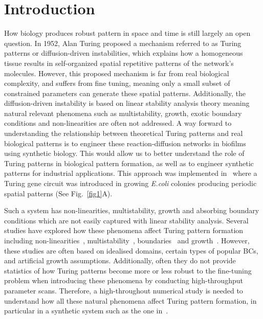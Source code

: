 \section*{Introduction}

How biology produces robust pattern in space and time is still largely an open question.
In 1952, Alan Turing proposed a mechanism referred to as Turing patterns or diffusion-driven instabilities, which explains how a homogeneous tissue results in self-organized spatial repetitive patterns of the network’s molecules.
However, this proposed mechanism is far from real biological complexity, and suffers from fine tuning, meaning only a small subset of constrained parameters can generate these spatial patterns.
Additionally, the diffusion-driven instability is based on linear stability analysis theory meaning natural relevant phenomena such as multistability, growth, exotic boundary conditions and non-linearities are often not addressed.
A way forward to understanding the relationship between theoretical Turing patterns and real biological patterns is to engineer these reaction-diffusion networks in biofilms using synthetic biology.
This would allow us to better understand the role of Turing patterns in biological pattern formation, as well as to engineer synthetic patterns for industrial applications.
This approach was implemented in~\cite{Oliver2023} where a Turing gene circuit was introduced in growing \textit{E.coli} colonies producing periodic spatial patterns (See Fig.~\ref{fig1}A).

Such a system has non-linearities, multistability, growth and absorbing boundary conditions which are not easily captured with linear stability analysis.
Several studies have explored how these phenomena affect Turing pattern formation including non-linearities~\parencite{ermentrout1991stripes}, multistability~\parencite{Krause2023}, boundaries~\parencite{Arcuri1986,Maini1993, Maini1997,Krause2020, Krause2021, Woolley2022} and growth~\parencite{gaffney2010, Klika2017, Krause2019}.
However, these studies are often based on idealised domains, certain types of popular BCs, and artificial growth assumptions.
Additionally, often they do not provide statistics of how Turing patterns become more or less robust to the fine-tuning problem when introducing these phenomena by conducting high-throughput parameter scans.
Therefore, a high-throughout numerical study is needed to understand how all these natural phenomena affect Turing pattern formation, in particular in a synthetic system such as the one in~\cite{Oliver2023}.

